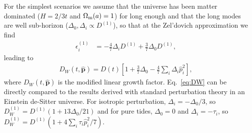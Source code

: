 \documentclass[a4paper,11pt]{article}
\newcommand{\vp}{{\bm p}}
\begin{document}
For the simplest scenarios we assume that the universe has been matter
dominated ($H = 2/3t$ and $\Omega_{\rm m}(a) = 1$) for long enough and
that the long modes are well sub-horizon ($\Delta_0, \Delta_i \propto D^{(1)}$), so
that at the Zel'dovich approximation we find
\begin{align}
    \epsilon^{(1)}_i &=
    -\frac47 \Delta_i D^{(1)} + \frac37 \Delta_0 D^{(1)},
\end{align}
leading to
\begin{align}
D_W(t, \hat\vp) = D(t)\left[1 + \frac{3}{7}\Delta_0 - \frac{4}{7}\sum_i \Delta_i\hat{p}_i^2 \right],
\label{eq:DW}
\end{align}
where $D_W(t,\hat\vp)$ is the modified linear growth factor.
Eq.~\eqref{eq:DW} can be directly compared to the results derived with standard
perturbation theory in an Einstein de-Sitter universe.
For isotropic perturbation, $\Delta_i = - \Delta_0 / 3$, so $D^{(1)}_W = D^{(1)} (1 + 13
\Delta_0 / 21)$ and for pure tides, $\Delta_0=0$ and $\Delta_i = -\tau_i$, so $D^{(1)}_W = D^{(1)} (1 + 4\sum_i \tau_i\hat{p}_i^2 / 7)$.
\end{document}
